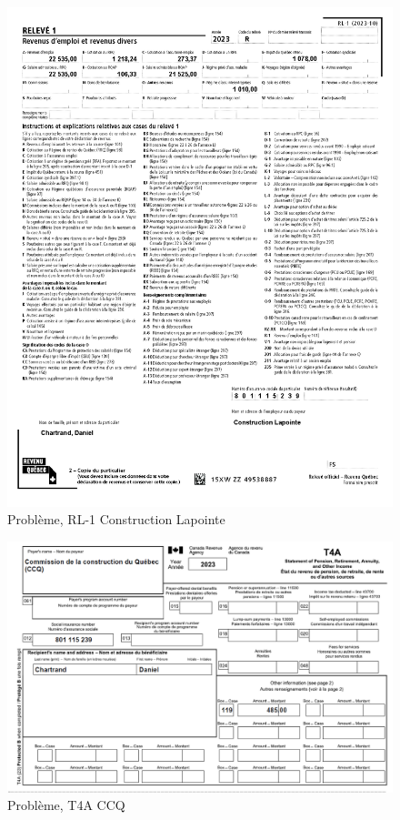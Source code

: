 \begin{figure}
	\centering
	\includegraphics[width=.9\textwidth]{probleme/chapitre-2/RL1-ConstructionLapointe.png}
	\caption[]{Problème, RL-1 Construction Lapointe}
	\label{fig:pb2RL1ConstructionLapointe}
\end{figure}

\begin{figure}
	\centering
	\includegraphics[width=.9\textwidth]{probleme/chapitre-2/T4A-CCQ.png}
	\caption[]{Problème, T4A CCQ}
	\label{fig:Chap2T4ACCQ}
\end{figure}


